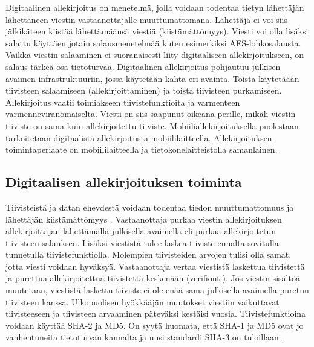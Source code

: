 \documentclass[finnish]{tktltiki2}
\theoremstyle{definition}
\theoremstyle{remark}
\begin{document}
Digitaalinen allekirjoitus on menetelmä, jolla voidaan todentaa tietyn lähettäjän lähettäneen viestin vastaanottajalle muuttumattomana. Lähettäjä ei voi siis jälkikäteen kiistää lähettämäänsä viestiä (kiistämättömyys). Viesti voi olla lisäksi salattu käyttäen jotain salausmenetelmää kuten esimerkiksi AES-lohkosalausta. Vaikka viestin salaaminen ei suoranaisesti liity digitaaliseen allekirjoitukseen, on salaus tärkeä osa tietoturvaa. Digitaalinen allekirjoitus pohjautuu julkisen avaimen infrastruktuuriin, jossa käytetään kahta eri avainta. Toista käytetäään tiivisteen salaamiseen (allekirjoittaminen) ja toista tiivisteen purkamiseen. Allekirjoitus vaatii toimiakseen tiivistefunktioita ja varmenteen varmenneviranomaiselta. Viesti on siis saapunut oikeana perille, mikäli viestin tiiviste on sama kuin allekirjoitettu tiiviste. Mobiiliallekirjoituksella puolestaan tarkoitetaan digitaalista allekirjoitusta mobiililaitteella. Allekirjoituksen toimintaperiaate on mobiililaitteella ja tietokonelaitteistolla samanlainen.

\subsection{Digitaalisen allekirjoituksen toiminta} 

Tiivisteistä ja datan eheydestä voidaan todentaa tiedon muuttumattomuus ja lähettäjän kiistämättömyys \cite{moen}. Vastaanottaja purkaa viestin allekirjoituksen allekirjoittajan lähettämällä julkisella avaimella eli purkaa allekirjoitetun tiivisteen salauksen. Lisäksi viestistä tulee laskea tiiviste ennalta sovitulla tunnetulla tiivistefunktiolla. Molempien tiivisteiden arvojen tulisi olla samat, jotta viesti voidaan hyväksyä. Vastaanottaja vertaa viestistä laskettua tiivistettä ja purettua allekirjoitettua tiivistettä keskenään (verifionti). Jos viestin sisältöä muutetaan, viestistä laskettu tiiviste ei ole enää sama julkisella avaimella puretun tiivisteen kanssa. Ulkopuolisen hyökkääjän muutokset viestiin vaikuttavat tiivisteeseen ja tiivisteen arvaaminen päteväksi kestäisi vuosia. Tiivistefunktioina voidaan käyttää SHA-2 ja MD5. On syytä huomata, että SHA-1 ja MD5 ovat jo vanhentuneita tietoturvan kannalta ja uusi standardi SHA-3 on tuloillaan \cite{nist}.   
\end{document}
